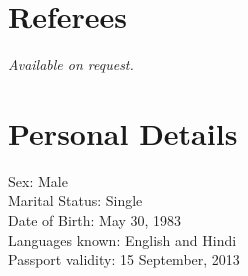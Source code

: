 \documentclass[margin,line]{resume}
\begin{document}
\begin{resume}
	\section{\mysidestyle Referees} 
	{\sl Available on request.}


	\section{\mysidestyle Personal Details} 
	Sex: Male\\
	Marital Status: Single\\
	Date of Birth: May 30, 1983\\
	Languages known: English and Hindi\\
	Passport validity: 15 September, 2013

	
	
	
	\end{resume}
	
\end{document}
